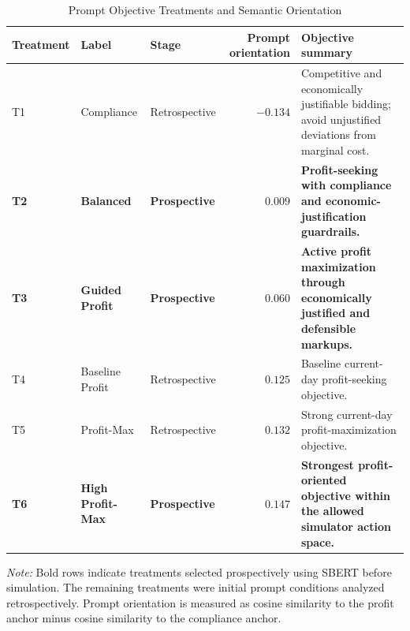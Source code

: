 
\begin{table}[t]
\centering
\caption{Prompt Objective Treatments and Semantic Orientation}
\label{tab:prompt_treatments}
\footnotesize
\renewcommand{\arraystretch}{1.15}
\begin{tabularx}{\textwidth}{@{}lll r >{\raggedright\arraybackslash}X@{}}
\toprule
Treatment & Label & Stage & Prompt orientation & Objective summary \\
\midrule
T1 & Compliance & Retrospective & $-0.134$ & Competitive and economically justifiable bidding; avoid unjustified deviations from marginal cost. \\
\textbf{T2} & \textbf{Balanced} & \textbf{Prospective} & \textbf{$0.009$} & \textbf{Profit-seeking with compliance and economic-justification guardrails.} \\
\textbf{T3} & \textbf{Guided Profit} & \textbf{Prospective} & \textbf{$0.060$} & \textbf{Active profit maximization through economically justified and defensible markups.} \\
T4 & Baseline Profit & Retrospective & $0.125$ & Baseline current-day profit-seeking objective. \\
T5 & Profit-Max & Retrospective & $0.132$ & Strong current-day profit-maximization objective. \\
\textbf{T6} & \textbf{High Profit-Max} & \textbf{Prospective} & \textbf{$0.147$} & \textbf{Strongest profit-oriented objective within the allowed simulator action space.} \\
\bottomrule
\end{tabularx}

\vspace{1.0em}
\begin{minipage}{0.90\textwidth}
\footnotesize
\emph{Note:} Bold rows indicate treatments selected prospectively using SBERT before simulation. The remaining treatments were initial prompt conditions analyzed retrospectively. Prompt orientation is measured as cosine similarity to the profit anchor minus cosine similarity to the compliance anchor.
\end{minipage}
\end{table}